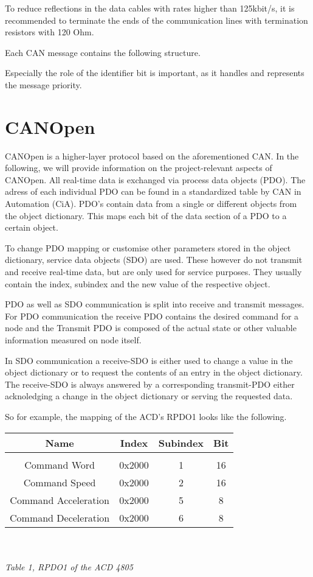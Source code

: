 To reduce reflections in the data cables with rates higher than 125kbit/s, it is recommended to terminate the ends of the communication lines with termination resistors with 120 Ohm. 

Each CAN message contains the following structure.

Especially the role of the identifier bit is important, as it handles and represents the message priority.

\pagebreak

\section{CANOpen}

CANOpen is a higher-layer protocol based on the aforementioned CAN. In the following, we will provide information on the project-relevant aspects of CANOpen.
All real-time data is exchanged via process data objects (PDO). The adress of each individual PDO can be found in a standardized table by CAN in Automation (CiA). PDO's contain data from a single or different objects from the object dictionary. This maps each bit of the data section of a PDO to a certain object.

To change PDO mapping or customise other parameters stored in the object dictionary, service data objects (SDO) are used. These however do not transmit and receive real-time data, but are only used for service purposes. They usually contain the index, subindex and the new value of the respective object.

PDO as well as SDO communication is split into receive and transmit messages.
 For PDO communication the receive PDO contains the desired command for a node and the Transmit PDO is composed of the actual state or other valuable information measured on node itself.

In SDO communication a receive-SDO is either used to change a value in the object dictionary or to request the contents of an entry in the object dictionary. The receive-SDO is always answered by a corresponding transmit-PDO either acknoledging a change in the object dictionary or serving the requested data.

So for example, the mapping of the ACD's RPDO1 looks like the following.

\begin{tabular}{|c|c|c|c|}
	\hline 
	Name & Index & Subindex & Bit \\ 
	\hline 
	&  &  &  \\ 
	\hline 
	Command Word & 0x2000 & 1 & 16 \\ 
	\hline 
	Command Speed & 0x2000 & 2 & 16 \\ 
	\hline 
	Command Acceleration & 0x2000 & 5 & 8 \\ 
	\hline 
	Command Deceleration & 0x2000 & 6 & 8 \\ 
	\hline 
\end{tabular} 
\\
\\
\textit{Table 1, RPDO1 of the ACD 4805}

